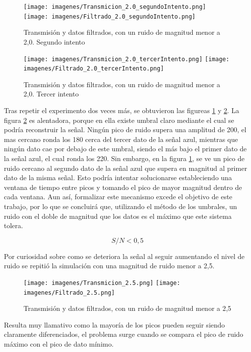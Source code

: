 \documentclass[12pt,letterpaper]{article}     %
\begin{document}
\begin{figure}[!ht]
\centering
\texttt{[image: imagenes/Transmicion\_2.0\_segundoIntento.png]}
\texttt{[image: imagenes/Filtrado\_2.0\_segundoIntento.png]}
\caption{Transmisión y datos filtrados, con un ruido de magnitud menor a 2,0. Segundo intento}
\label{fig:filtro202}
\end{figure}

\begin{figure}[!ht]
\centering
\texttt{[image: imagenes/Transmicion\_2.0\_tercerIntento.png]}
\texttt{[image: imagenes/Filtrado\_2.0\_tercerIntento.png]}
\caption{Transmisión y datos filtrados, con un ruido de magnitud menor a 2,0. Tercer intento}
\label{fig:filtro203}
\end{figure}

Tras repetir el experimento dos veces más, se obtuvieron las figureas \ref{fig:filtro202}
y \ref{fig:filtro203}. La figura \ref{fig:filtro203} es alentadora, porque en ella existe umbral
claro mediante el cual se podría reconstruir la señal. Ningún pico de ruido supera una amplitud de 200,
el mas cercano ronda los 180 cerca del tercer dato de la señal azul, mientras que ningún dato cae por
debajo de este umbral, siendo el más bajo el primer dato de la señal azul, el cual ronda los 220.
Sin embargo, en la figura \ref{fig:filtro202}, se ve un pico de ruido cercano al segundo dato de la
señal azul que supera en magnitud al primer dato de la misma señal. Esto podría intentar solucionarse
estableciendo una ventana de tiempo entre picos y tomando el pico de mayor magnitud dentro de cada ventana.
Aun así, formalizar este mecanismo excede el objetivo de este trabajo, por lo que se concluirá que,
utilizando el método de los umbrales, un ruido con el doble de magnitud que los datos es el máximo que este
sistema tolera.

\begin{equation}
	S/N < 0,5
\end{equation}

Por curiosidad sobre como se deteriora la señal al seguir aumentando el nivel de ruido se repitió
la simulación con una magnitud de ruido menor a 2,5.

\begin{figure}[!ht]
\centering
\texttt{[image: imagenes/Transmicion\_2.5.png]}
\texttt{[image: imagenes/Filtrado\_2.5.png]}
\caption{Transmisión y datos filtrados, con un ruido de magnitud menor a 2,5}
\label{fig:filtro25}
\end{figure}

Resulta muy llamativo como la mayoría de los picos pueden seguir siendo claramente diferenciados, 
el problema surge cuando se compara el pico de ruido máximo con el pico de dato mínimo. 
\end{document}
